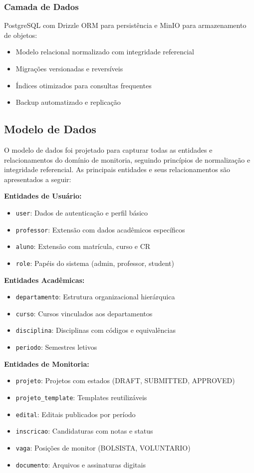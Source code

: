 \documentclass[portuguese]{sbc2025}%
\begin{document}
\subsubsection{Camada de Dados}

PostgreSQL com Drizzle ORM para persistência e MinIO para armazenamento de objetos:
\begin{itemize}
  \item Modelo relacional normalizado com integridade referencial
  \item Migrações versionadas e reversíveis
  \item Índices otimizados para consultas frequentes
  \item Backup automatizado e replicação
\end{itemize}

\subsection{Modelo de Dados}

O modelo de dados foi projetado para capturar todas as entidades e relacionamentos do domínio de monitoria, seguindo princípios de normalização e integridade referencial. As principais entidades e seus relacionamentos são apresentados a seguir:

\textbf{Entidades de Usuário:}
\begin{itemize}
  \item \texttt{user}: Dados de autenticação e perfil básico
  \item \texttt{professor}: Extensão com dados acadêmicos específicos
  \item \texttt{aluno}: Extensão com matrícula, curso e CR
  \item \texttt{role}: Papéis do sistema (admin, professor, student)
\end{itemize}

\textbf{Entidades Acadêmicas:}
\begin{itemize}
  \item \texttt{departamento}: Estrutura organizacional hierárquica
  \item \texttt{curso}: Cursos vinculados aos departamentos
  \item \texttt{disciplina}: Disciplinas com códigos e equivalências
  \item \texttt{periodo}: Semestres letivos
\end{itemize}

\textbf{Entidades de Monitoria:}
\begin{itemize}
  \item \texttt{projeto}: Projetos com estados (DRAFT, SUBMITTED, APPROVED)
  \item \texttt{projeto\_template}: Templates reutilizáveis
  \item \texttt{edital}: Editais publicados por período
  \item \texttt{inscricao}: Candidaturas com notas e status
  \item \texttt{vaga}: Posições de monitor (BOLSISTA, VOLUNTARIO)
  \item \texttt{documento}: Arquivos e assinaturas digitais
\end{itemize}
\end{document}
